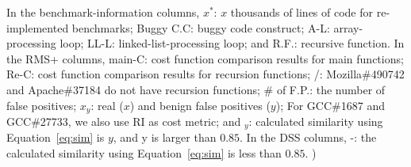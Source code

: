 \begin{table*}[h!]
{{   In the benchmark-information columns,
   $x^*$: $x$ thousands of lines of code for re-implemented benchmarks;
   Buggy C.C: buggy code construct;
   A-L: array-processing loop;
   LL-L: linked-list-processing loop; and
   R.F.: recursive function.
   In the RMS+ columns,
   main-C: cost function comparison results for main functions;
   Re-C: cost function comparison results for recursion functions;
   /: Mozilla\#490742 and Apache\#37184 do not have recursion functions;
   \# of F.P.: the number of false positives;
   $x_y$: real ($x$) and benign false positives ($y$);
   For GCC\#1687 and GCC\#27733, we also use RI as cost metric;
   and $_{y}$: calculated similarity using Equation~\ref{eq:sim} is $y$, and y is larger than $0.85$.
    In the DSS columns,
    -: the calculated similarity using Equation~\ref{eq:sim} is less than $0.85$.
)}}
  \label{tab:benchmark_info}
\vspace{-0.15in}
\end{table*}
